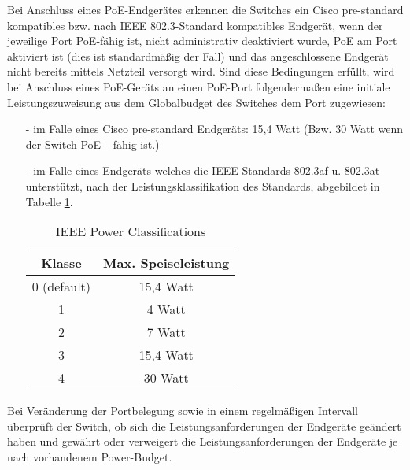 Bei Anschluss eines PoE-Endger\"ates erkennen die Switches ein Cisco pre-standard kompatibles bzw. nach IEEE 802.3-Standard kompatibles Endger\"at, wenn der jeweilige Port PoE-f\"ahig ist, nicht administrativ deaktiviert wurde, PoE am Port aktiviert ist (dies ist standardm\"a{\ss}ig der Fall) und das angeschlossene Endger\"at nicht bereits mittels Netzteil versorgt wird. Sind diese Bedingungen erf\"ullt, wird bei Anschluss eines PoE-Ger\"ats an einen PoE-Port folgenderma{\ss}en eine initiale Leistungszuweisung aus dem Globalbudget des Switches dem Port zugewiesen:
\begin{itemize}
\item [-] im Falle eines Cisco pre-standard Endger\"ats: 15,4 Watt (Bzw. 30 Watt wenn der Switch PoE+-f\"ahig ist.)
\item [-] im Falle eines Endger\"ats welches die IEEE-Standards 802.3af u. 802.3at unterst\"utzt, nach der Leistungsklassifikation des Standards, abgebildet in Tabelle \ref{tab:ieeepowerclassifications}.
\begin{table}[h]
 \centering
 \begin{tabular}{|c|c|}
   \hline
   \textbf{Klasse} & \textbf{Max. Speiseleistung} \\
   \hline
   0 (default) & 15,4 Watt \\
   \hline
   1 & 4 Watt \\
   \hline
   2 & 7 Watt \\
   \hline
   3 & 15,4 Watt \\
   \hline
   4 & 30 Watt \\
   \hline
 \end{tabular}
 \caption{IEEE Power Classifications \cite{poe2}}
 \label{tab:ieeepowerclassifications}
\end{table}
\end{itemize}

Bei Ver\"anderung der Portbelegung sowie in einem regelm\"a{\ss}igen Intervall \"uberpr\"uft der Switch, ob sich die Leistungsanforderungen der Endger\"ate ge\"andert haben und gew\"ahrt oder verweigert die Leistungsanforderungen der Endger\"ate je nach vorhandenem Power-Budget.

